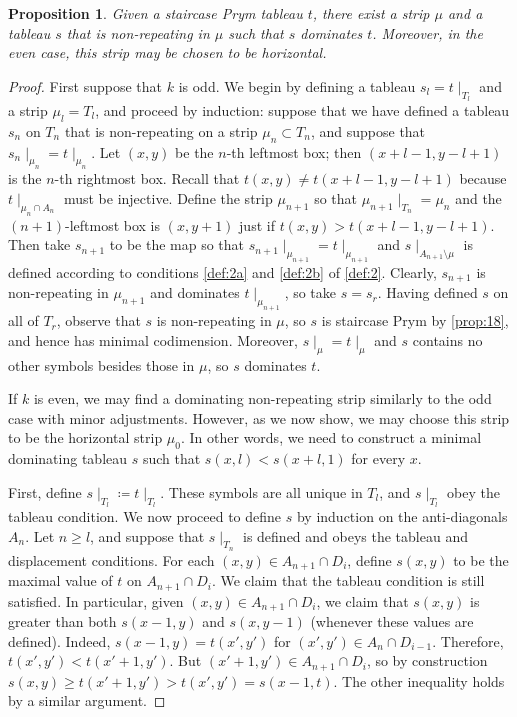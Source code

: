 \documentclass[11pt,reqno]{amsart}
\newcommand*{\restrict}[1]{{\mid}_{#1}}
\theoremstyle{definition}
\theoremstyle{problem}
\theoremstyle{plain}
\newtheorem{proposition}[definition]{Proposition}
\theoremstyle{remark}
\theoremstyle{theorem}
\numberwithin{equation}{section}
\numberwithin{figure}{section}
\theoremstyle{definition}
\theoremstyle{problem}
\theoremstyle{plain}
\begin{document}
\begin{proposition}\label{prop:14}
  Given a staircase Prym tableau $t$, there exist a strip $\mu$ and a
  tableau $s$ that is non-repeating in $\mu$ such that $s$ dominates
  $t$. Moreover, in the even case, this strip may be chosen to be horizontal. 
\end{proposition}
\begin{proof}
	First suppose that $k$ is odd.  
  We begin by defining a tableau $s_l = t\restrict{T_l}$ and a
  strip $\mu_l = T_l$, and proceed by induction: suppose that we
  have defined a tableau $s_n$ on $T_n$ that is non-repeating on a
  strip $\mu_n \subset T_n$, and suppose that
  $s_n\restrict{\mu_n} = t\restrict{\mu_n}$.
  Let $(x,y)$ be the $n$-th leftmost
  box; then $(x+l-1,y-l+1)$ is the $n$-th rightmost box.  Recall that
  $t(x,y) \neq t(x+l-1,y-l+1)$ because $t\restrict{\mu_n \cap A_n}$
  must be injective.  Define the strip $\mu_{n+1}$ so that
  $\mu_{n+1}\restrict{T_n} = \mu_n$ and the $(n+1)$-leftmost box is
  $(x,y+1)$ just if $t(x,y) > t(x+l-1,y-l+1)$.  Then take $s_{n+1}$ to
  be the map so that
  $s_{n+1}\restrict{\mu_{n+1}} = t\restrict{\mu_{n+1}}$ and
  $s\restrict{A_{n+1} \setminus \mu}$ is defined according to
  conditions \ref{def:2a} and \ref{def:2b} of \cref{def:2}.  Clearly,
  $s_{n+1}$ is non-repeating in $\mu_{n+1}$ and dominates
  $t\restrict{\mu_{n+1}}$, so take $s = s_r$.
  Having defined $s$ on all of $T_r$, observe that $s$ is
  non-repeating in $\mu$, so $s$ is staircase Prym by \cref{prop:18},
  and hence has minimal codimension.  Moreover,
  $s\restrict{\mu} = t\restrict{\mu}$ and $s$ contains no other
  symbols besides those in $\mu$, so $s$ dominates $t$.

  If $k$ is even, we may find a dominating non-repeating strip similarly to the odd case with minor adjustments. However, as we now show, we may choose this strip to be the horizontal strip $\mu_0$. In other words, we need to construct a minimal dominating tableau $s$ such that $s(x,l)< s(x+l,1)$ for every $x$.

  First,
  define $s\restrict{T_l} \coloneq t\restrict{T_l}$.  These symbols are
  all unique in $T_l$, and $s\restrict{T_l}$ obey the tableau
  condition.
  We now proceed to define $s$ by induction on the anti-diagonals
  $A_n$.  Let $n \geq l$, and suppose that $s\restrict{T_n}$ is defined
  and obeys the tableau and displacement conditions.  For each
  $(x,y)\in A_{n+1} \cap D_i$, define $s(x,y)$ to be the maximal value
  of $t$ on $A_{n+1}\cap D_i$.  We claim that the tableau condition is
  still satisfied.  In particular, given $(x,y)\in A_{n+1} \cap D_i$,
  we claim that $s(x,y)$ is greater than both $s(x-1,y)$ and
  $s(x,y-1)$ (whenever these values are defined). Indeed, $s(x-1,y) = t(x',y')$ for
  $(x',y')\in A_n \cap D_{i-1}$. Therefore, $t(x',y')<
  t(x'+1,y')$. But $(x'+1,y')\in A_{n+1}\cap D_i$, so by construction
  $s(x,y)\geq t(x'+1,y')>t(x',y')=s(x-1,t)$.  The other inequality
  holds by a similar argument. 
  

\end{proof}
\end{document}
